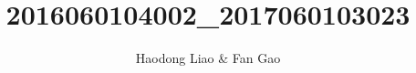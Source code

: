 \documentclass{article}
\title{2016060104002\_2017060103023}
\author{Haodong Liao \& Fan Gao}
\begin{document}
\maketitle{}











\end{document}
